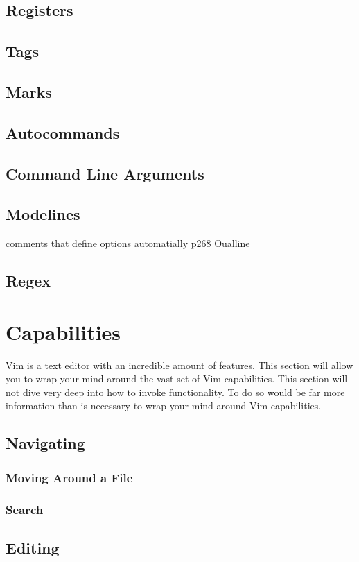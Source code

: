 \documentclass[12pt, oneside]{book}
\begin{document}
\section{Registers}
\section{Tags}
\section{Marks}
\section{Autocommands}
\section{Command Line Arguments}
\section{Modelines}
comments that define options automatially p268 Oualline
\section{Regex}

\chapter{Capabilities}
Vim is a text editor with an incredible amount of features.  This section will allow you to wrap your mind around the vast set of Vim capabilities.  This section will not dive very deep into how to invoke
functionality.  To do so would be far more information than is necessary to wrap your mind around Vim capabilities.
\section{Navigating}
  \subsection{Moving Around a File}
  \subsection{Search}
\section{Editing}
\end{document}
